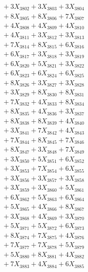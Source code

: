 \documentclass[a4paper,10pt]{article}
\begin{document}
{\begin{align}
&\;  + 3 X_{3802} + 3 X_{3803} + 3 X_{3804} \\[0.3ex]
&\;  + 8 X_{3805} + 8 X_{3806} + 7 X_{3807} \\[0.3ex]
&\;  + 4 X_{3808} + 4 X_{3809} + 4 X_{3810} \\[0.3ex]
&\;  + 4 X_{3811} + 3 X_{3812} + 3 X_{3813} \\[0.3ex]
&\;  + 7 X_{3814} + 8 X_{3815} + 6 X_{3816} \\[0.3ex]
&\;  + 6 X_{3817} + 3 X_{3818} + 3 X_{3819} \\[0.5ex]\allowbreak
&\;  + 6 X_{3820} + 5 X_{3821} + 3 X_{3822} \\[0.3ex]
&\;  + 6 X_{3823} + 6 X_{3824} + 6 X_{3825} \\[0.3ex]
&\;  + 8 X_{3826} + 3 X_{3827} + 3 X_{3828} \\[0.3ex]
&\;  + 3 X_{3829} + 8 X_{3830} + 8 X_{3831} \\[0.3ex]
&\;  + 7 X_{3832} + 4 X_{3833} + 8 X_{3834} \\[0.3ex]
&\;  + 8 X_{3835} + 4 X_{3836} + 3 X_{3837} \\[0.3ex]
&\;  + 8 X_{3838} + 8 X_{3839} + 4 X_{3840} \\[0.3ex]
&\;  + 3 X_{3841} + 7 X_{3842} + 4 X_{3843} \\[0.3ex]
&\;  + 7 X_{3844} + 8 X_{3845} + 7 X_{3846} \\[0.3ex]
&\;  + 8 X_{3847} + 3 X_{3848} + 7 X_{3849} \\[0.5ex]\allowbreak
&\;  + 3 X_{3850} + 5 X_{3851} + 6 X_{3852} \\[0.3ex]
&\;  + 3 X_{3853} + 7 X_{3854} + 6 X_{3855} \\[0.3ex]
&\;  + 3 X_{3856} + 3 X_{3857} + 3 X_{3858} \\[0.3ex]
&\;  + 3 X_{3859} + 3 X_{3860} + 5 X_{3861} \\[0.3ex]
&\;  + 6 X_{3862} + 5 X_{3863} + 6 X_{3864} \\[0.3ex]
&\;  + 5 X_{3865} + 4 X_{3866} + 8 X_{3867} \\[0.3ex]
&\;  + 3 X_{3868} + 4 X_{3869} + 3 X_{3870} \\[0.3ex]
&\;  + 5 X_{3871} + 5 X_{3872} + 6 X_{3873} \\[0.3ex]
&\;  + 8 X_{3874} + 7 X_{3875} + 4 X_{3876} \\[0.3ex]
&\;  + 7 X_{3877} + 7 X_{3878} + 5 X_{3879} \\[0.5ex]\allowbreak
&\;  + 5 X_{3880} + 8 X_{3881} + 4 X_{3882} \\[0.3ex]
&\;  + 7 X_{3883} + 4 X_{3884} + 6 X_{3885} \\[0.3ex]

\end{align}}
\end{document}
